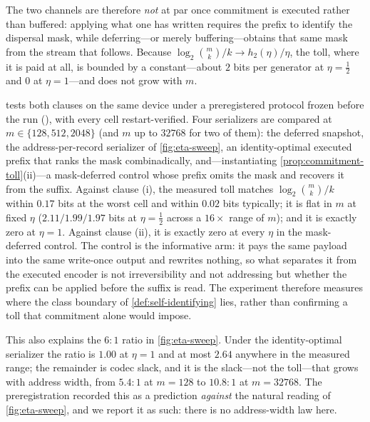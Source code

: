 \documentclass[a4paper,twocolumn,10pt,unpublished]{quantumarticle}
\begin{document}
The two channels are therefore \emph{not} at par once commitment is
executed rather than buffered: applying what one has written requires
the prefix to identify the dispersal mask, while deferring---or merely
buffering---obtains that same mask from the stream that follows.  Because
$\log_2\binom{m}{k}/k\to h_2(\eta)/\eta$, the toll,
where it is paid at all, is bounded by a constant---about $2$ bits per
generator at $\eta=\tfrac12$ and $0$ at $\eta=1$---and does not grow
with $m$.

 tests both clauses on the same device under a
preregistered protocol frozen before the run
(), with every cell
restart-verified.  Four serializers are compared at
$m\in\{128,512,2048\}$ (and $m$ up to $32768$ for two of them): the
deferred snapshot, the address-per-record serializer of
\cref{fig:eta-sweep}, an identity-optimal executed prefix that ranks
the mask combinadically, and---instantiating
\cref{prop:commitment-toll}(ii)---a mask-deferred control whose prefix
omits the mask and recovers it from the suffix.  Against clause (i),
the measured toll matches $\log_2\binom{m}{k}/k$ within $0.17$ bits at
the worst cell and within $0.02$ bits typically; it is flat in $m$ at
fixed $\eta$ ($2.11/1.99/1.97$ bits at $\eta=\tfrac12$ across a
$16\times$ range of $m$); and it is exactly zero at $\eta=1$.  Against
clause (ii), it is exactly zero at every $\eta$ in the mask-deferred
control.  The control is the informative arm: it pays the same payload
into the same write-once output and rewrites nothing, so what separates
it from the executed encoder is not irreversibility and not addressing
but whether the prefix can be applied before the suffix is read.  The
experiment therefore measures where the class boundary of
\cref{def:self-identifying} lies, rather than confirming a toll that
commitment alone would impose.

This also explains the $6{:}1$ ratio in \cref{fig:eta-sweep}.  Under
the identity-optimal serializer the ratio is $1.00$ at $\eta=1$ and at
most $2.64$ anywhere in the measured range; the remainder is codec
slack, and it is the slack---not the toll---that grows with address
width, from $5.4{:}1$ at $m=128$ to $10.8{:}1$ at $m=32768$.  The
preregistration recorded this as a prediction \emph{against} the
natural reading of \cref{fig:eta-sweep}, and we report it as such: there
is no address-width law here.
\end{document}
